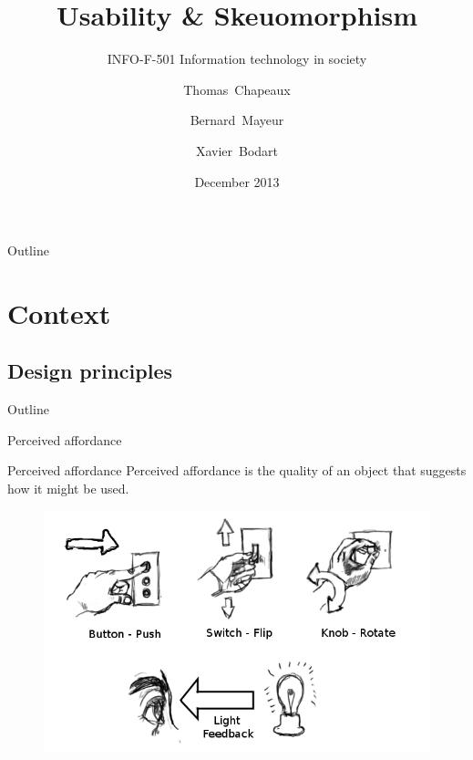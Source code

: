 \documentclass{beamer}
\title {Usability \& Skeuomorphism}
\subtitle {INFO-F-501 Information technology in society}
\author{Thomas~Chapeaux  \and Bernard~Mayeur \and Xavier~Bodart }
\institute[shortinst]{Université Libre de Bruxelles \\ Belgium}
\date{December 2013}
\begin{document}
\maketitle{}

\begin{frame}{Outline}
    \tableofcontents
\end{frame}

\section{Context}

\subsection{Design principles}

\begin{frame}{Outline}
    \tableofcontents[currentsection]
\end{frame}



\begin{frame}{Perceived affordance}
	\begin{block}{Perceived affordance}
	Perceived affordance is the quality of an object that suggests how it might be used.
	\end{block}
	\begin{figure}[ht]
	\includegraphics[scale=0.3]{switches.png}
	\end{figure}
\end{frame}
\end{document}
